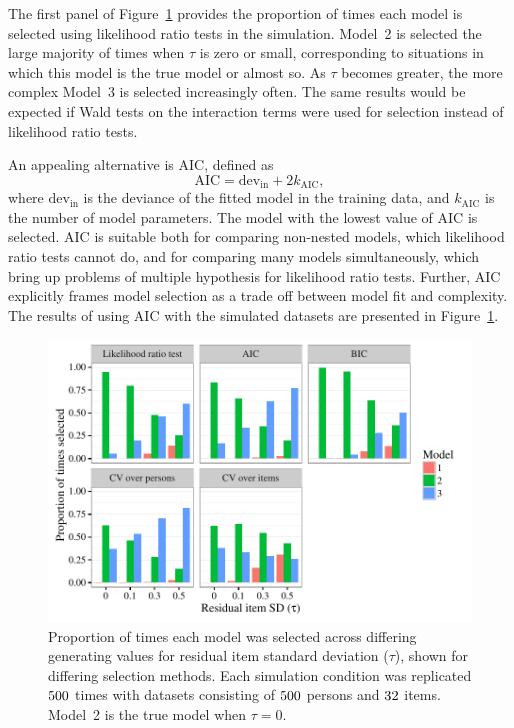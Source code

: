 \documentclass[12pt, letterpaper]{article}
\begin{document}
The first panel of Figure~\ref{fig:select-overtau} provides the proportion of times each model is selected using likelihood ratio tests in the simulation.
Model~2 is selected the large majority of times when $\tau$ is zero or small, corresponding to situations in which this model is the true model or almost so.
As $\tau$ becomes greater, the more complex Model~3 is selected increasingly often.
The same results would be expected if Wald tests on the interaction terms were used for selection instead of likelihood ratio tests.

An appealing alternative is AIC, defined as
\begin{equation} \label{eq:aic}
\mathrm{AIC} = \mathrm{dev_{in}} + 2k_\mathrm{AIC}
,\end{equation}
where $\mathrm{dev_{in}}$ is the deviance of the fitted model in the training data, and $k_\mathrm{AIC}$ is the number of model parameters. The model with the lowest value of AIC is selected.
AIC is suitable both for comparing non-nested models, which likelihood ratio tests cannot do, and for comparing many models simultaneously, which bring up problems of multiple hypothesis for likelihood ratio tests. Further, AIC explicitly frames model selection as a trade off between model fit and complexity. 
The results of using AIC with the simulated datasets are presented in Figure~\ref{fig:select-overtau}. 

\begin{figure}[tbp]
	\centering
	\includegraphics{chapter_2/figs/select_overtau.pdf}
	\caption{Proportion of times each model was selected across differing generating values for residual item standard deviation ($\tau$), shown for differing selection methods. Each simulation condition was replicated $500$ times with datasets consisting of $500$ persons and $32$ items. Model~2 is the true model when $\tau = 0$.}
	\label{fig:select-overtau}
\end{figure}
\end{document}
